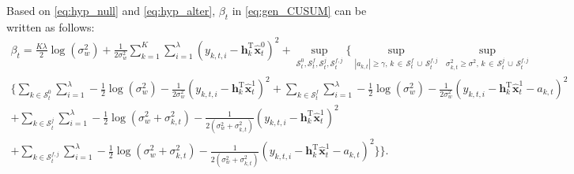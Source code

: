\documentclass[onecolumn]{IEEEtran}
\begin{document}
Based on \eqref{eq:hyp_null} and \eqref{eq:hyp_alter}, $\beta_t$ in \eqref{eq:gen_CUSUM} can be written as follows:
\begin{gather} \nonumber
\beta_t = \frac{K \lambda}{2} \log(\sigma_w^2) + \frac{1}{2 \sigma_w^2} \sum_{k=1}^{K} \sum_{i=1}^{\lambda} (y_{k,t,i} - \mathbf{h}_k^\mathrm{T} \hat{\mathbf{x}}_t^0)^2
+ \sup_{\mathcal{S}_t^0,\mathcal{S}_t^f,\mathcal{S}_t^j,\mathcal{S}_t^{f,j}} \Bigg\{ \sup_{|a_{k,t}| \geq \gamma, \, k \, \in \, \mathcal{S}_t^f \, \cup \, \mathcal{S}_t^{f,j}} \, \sup_{\sigma_{k,t}^2 \geq \sigma^2, \, k \, \in \, \mathcal{S}_t^j \, \cup \, \mathcal{S}_t^{f,j}} \\ \nonumber
\bigg\{ \sum_{k \in \mathcal{S}_t^0} \sum_{i=1}^{\lambda} -\frac{1}{2} \log(\sigma_w^2) - \frac{1}{2 \sigma_w^2} (y_{k,t,i} - \mathbf{h}_k^\mathrm{T} \hat{\mathbf{x}}_t^1)^2
+ \sum_{k \in \mathcal{S}_t^f} \sum_{i=1}^{\lambda} -\frac{1}{2} \log(\sigma_w^2) - \frac{1}{2 \sigma_w^2} (y_{k,t,i} - \mathbf{h}_k^\mathrm{T} \hat{\mathbf{x}}_t^1 - a_{k,t})^2 \\ \nonumber
+ \sum_{k \in \mathcal{S}_t^j} \sum_{i=1}^{\lambda} -\frac{1}{2} \log(\sigma_w^2 + \sigma_{k,t}^2) - \frac{1}{2 (\sigma_w^2 + \sigma_{k,t}^2)} (y_{k,t,i} - \mathbf{h}_k^\mathrm{T} \hat{\mathbf{x}}_t^1)^2 \\ \label{eq:beta_t_v1}
+ \sum_{k \in \mathcal{S}_t^{f,j}} \sum_{i=1}^{\lambda} -\frac{1}{2} \log(\sigma_w^2 + \sigma_{k,t}^2) - \frac{1}{2 (\sigma_w^2 + \sigma_{k,t}^2)} (y_{k,t,i} - \mathbf{h}_k^\mathrm{T} \hat{\mathbf{x}}_t^1 - a_{k,t})^2  \bigg\} \Bigg\}.
\end{gather}
\end{document}
